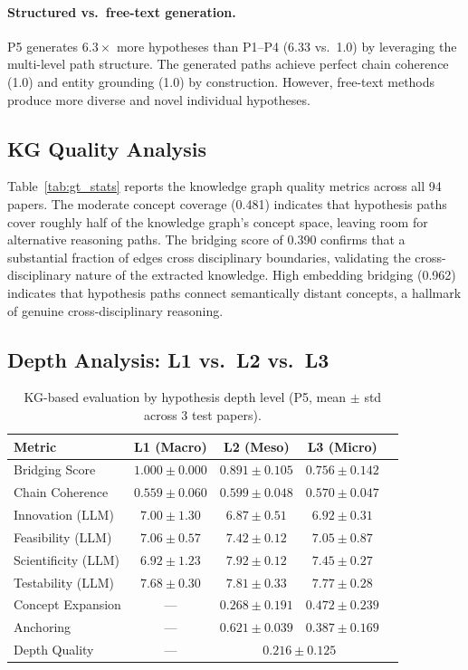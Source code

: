 \documentclass{article}
\begin{document}
\paragraph{Structured vs.\ free-text generation.}
P5 generates $6.3\times$ more hypotheses than P1--P4 (6.33 vs.\ 1.0) by leveraging the multi-level path structure.
The generated paths achieve perfect chain coherence (1.0) and entity grounding (1.0) by construction.
However, free-text methods produce more diverse and novel individual hypotheses.

\subsection{KG Quality Analysis}
\label{sec:kg_quality}

Table~\ref{tab:gt_stats} reports the knowledge graph quality metrics across all 94 papers.
The moderate concept coverage (0.481) indicates that hypothesis paths cover roughly half of the knowledge graph's concept space, leaving room for alternative reasoning paths.
The bridging score of 0.390 confirms that a substantial fraction of edges cross disciplinary boundaries, validating the cross-disciplinary nature of the extracted knowledge.
High embedding bridging (0.962) indicates that hypothesis paths connect semantically distant concepts, a hallmark of genuine cross-disciplinary reasoning.

\subsection{Depth Analysis: L1 vs.\ L2 vs.\ L3}
\label{sec:depth}

\begin{table}[t]
\centering
\caption{KG-based evaluation by hypothesis depth level (P5, mean $\pm$ std across 3 test papers).}
\label{tab:depth}
\small
\begin{tabular}{lcccc}
\toprule
\textbf{Metric} & \textbf{L1 (Macro)} & \textbf{L2 (Meso)} & \textbf{L3 (Micro)} \\
\midrule
Bridging Score & $1.000 \pm 0.000$ & $0.891 \pm 0.105$ & $0.756 \pm 0.142$ \\
Chain Coherence & $0.559 \pm 0.060$ & $0.599 \pm 0.048$ & $0.570 \pm 0.047$ \\
Innovation (LLM) & $7.00 \pm 1.30$ & $6.87 \pm 0.51$ & $6.92 \pm 0.31$ \\
Feasibility (LLM) & $7.06 \pm 0.57$ & $7.42 \pm 0.12$ & $7.05 \pm 0.87$ \\
Scientificity (LLM) & $6.92 \pm 1.23$ & $7.92 \pm 0.12$ & $7.45 \pm 0.27$ \\
Testability (LLM) & $7.68 \pm 0.30$ & $7.81 \pm 0.33$ & $7.77 \pm 0.28$ \\
\midrule
Concept Expansion & --- & $0.268 \pm 0.191$ & $0.472 \pm 0.239$ \\
Anchoring & --- & $0.621 \pm 0.039$ & $0.387 \pm 0.169$ \\
Depth Quality & --- & \multicolumn{2}{c}{$0.216 \pm 0.125$} \\
\bottomrule
\end{tabular}
\end{table}
\end{document}
